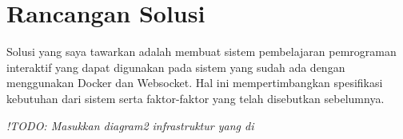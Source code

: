 \section{Rancangan Solusi}
Solusi yang saya tawarkan adalah membuat sistem pembelajaran pemrograman interaktif yang dapat digunakan pada sistem yang sudah ada dengan menggunakan Docker dan Websocket. Hal ini mempertimbangkan spesifikasi kebutuhan dari sistem serta faktor-faktor yang telah disebutkan sebelumnya.

\textit{!TODO: Masukkan diagram2 infrastruktur yang di}